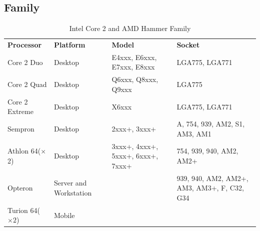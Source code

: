 \documentclass[letterpaper,10pt,compsoc,draftclsnofoot,onecolumn]{IEEEtran}
\begin{document}
\subsection{Family}
\begin{table}[!bhpt]
\captionsetup{justification=centering, aboveskip=2em, belowskip=0em}
\begin{tabularx}{\textwidth}{m{1in}m{2in}m{2in}m{1in}}
\textbf{Processor} & \textbf{Platform} & \textbf{Model} & \textbf{Socket}
\\
Core 2 Duo & Desktop & E4xxx, E6xxx, E7xxx, E8xxx & LGA775, LGA771
\\
Core 2 Quad & Desktop & Q6xxx, Q8xxx, Q9xxx & LGA775
\\
Core 2 Extreme & Desktop & X6xxx & LGA775, LGA771
\\
Sempron & Desktop & 2xxx+, 3xxx+ & A, 754, 939, AM2, S1, AM3, AM1
\\
Athlon 64($\times$2) & Desktop & 3xxx+, 4xxx+, 5xxx+, 6xxx+, 7xxx+ & 754, 939, 940, AM2, AM2+
\\
Opteron & Server and Workstation &  & 939, 940, AM2, AM2+, AM3, AM3+, F, C32, G34
\\
Turion 64($\times2$) & Mobile &  &
\end{tabularx}
\caption{Intel Core 2 and AMD Hammer Family}
\end{table}
\clearpage
\end{document}
